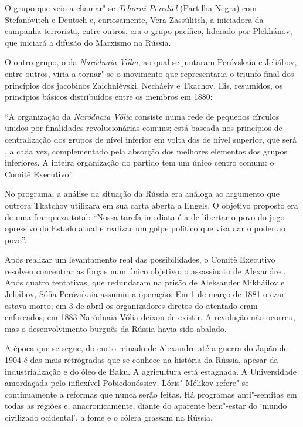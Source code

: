 O grupo que veio a chamar"-se \emph{Tchorni Perediel} (Partilha Negra)
com Stefanóvitch e Deutsch e, curiosamente, Vera Zassúlitch, a
iniciadora da campanha terrorista, entre outros, era o grupo pacífico,
liderado por Plekhánov, que iniciará a difusão do Marxismo na Rússia.

O outro grupo, o da \emph{Naródnaia Vólia}, ao qual se juntaram
Peróvskaia e Jeliábov, entre outros, viria a tornar"-se o movimento que
representaria o triunfo final dos princípios dos jacobinos Zaichniévski,
Necháeiv e Tkachov. Eis, resumidos, os princípios básicos distribuídos
entre os membros em 1880:

``A organização da \emph{Naródnaia Vólia} consiste numa rede de pequenos
círculos unidos por finalidades revolucionárias comuns; está baseada nos
princípios de centralização dos grupos de nível inferior em volta dos de
nível superior, que será , a cada vez, complementado pela absorção dos
melhores elementos dos grupos inferiores. A inteira organização do
partido tem um único centro comum: o Comitê Executivo''.

No programa, a análise da situação da Rússia era análoga ao argumento
que outrora Tkatchov utilizara em sua carta aberta a Engels. O objetivo
proposto era de uma franqueza total: ``Nossa tarefa imediata é a de
libertar o povo do jugo opressivo do Estado atual e realizar um golpe
político que visa dar o poder ao povo''.

Após realizar um levantamento real das possibilidades, o Comitê
Executivo resolveu concentrar as forças num único objetivo: o
assassinato de Alexandre . Após quatro tentativas, que redundaram na
prisão de Aleksander Mikháilov e Jeliábov, Sófia Peróvskaia assumiu a
operação. Em 1 de março de 1881 o czar estava morto; em 3 de abril os
organizadores diretos do atentado eram enforcados; em 1883
Naródnaia Vólia deixou de existir. A revolução não ocorreu, mas o
desenvolvimento burguês da Rússia havia sido abalado.

A época que se segue, do curto reinado de Alexandre  até a guerra do
Japão de 1904 é das mais retrógradas que se conhece na história da
Rússia, apesar da industrialização e do óleo de Baku. A agricultura está
estagnada. A Universidade amordaçada pelo inflexível Pobiedonóssiev.
Lóris"-Mélikov refere"-se continuamente a reformas que nunca serão feitas.
Há programas anti"-semitas em todas as regiões e, anacronicamente, diante
do aparente bem"-estar do `mundo civilizado ocidental', a fome e o cólera
grassam na Rússia.

